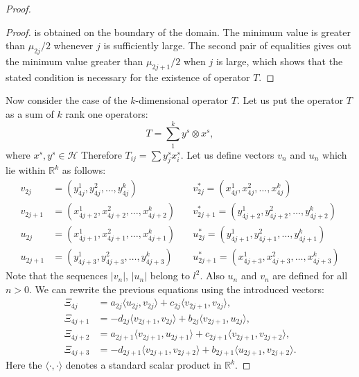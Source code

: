 \documentclass[12pt]{article}
\renewcommand{\cal}[1]{\mathcal{#1}}
\theoremstyle{definition}
\numberwithin{remark}{section}
\numberwithin{theorem}{section}
\numberwithin{prop}{section}
\numberwithin{equation}{section}
\numberwithin{lemma}{section}
\numberwithin{prop_under_lemma}{lemma}
\begin{document}
\begin{proof}
\begin{proof}
            is obtained on the boundary of the domain. The minimum value is greater than $\mu_{2j}/2$ whenever $j$ is
            sufficiently large.
            The second pair of equalities gives out the minimum value greater than $\mu_{2j+1}/2$ when $j$ is large,
            which shows that the stated condition is necessary for the existence of operator $T$.
        \end{proof}
        Now consider the case of the $k$-dimensional operator $T$.
        Let us put the operator $T$ as a sum of $k$ rank one operators:
        $$
            T = \sum_1^k y^s \otimes x^s,
        $$
        where $x^s, y^s \in \cal{H}$
        Therefore $T_{ij} = \sum {y^s_j x^s_i}$.
        Let us define vectors $v_n$ and $u_n$ which lie within $\mathbb{R}^k$ as follows:
        \begin{align*}
            v_{2j} &= (y^1_{4j}, y^2_{4j}, \dots ,y^k_{4j}) \quad
            &v^*_{2j} = (x^1_{4j}, x^2_{4j}, \dots ,x^k_{4j}) \\
            v_{2j+1} &= (x^1_{4j+2}, x^2_{4j+2}, \dots ,x^k_{4j+2}) \quad
            &v^*_{2j+1} = (y^1_{4j+2}, y^2_{4j+2}, \dots ,y^k_{4j+2}) \\
            u_{2j} &= (x^1_{4j+1}, x^2_{4j+1}, \dots ,x^k_{4j+1}) \quad
            &u^*_{2j} = (y^1_{4j+1}, y^2_{4j+1}, \dots ,y^k_{4j+1}) \\
            u_{2j+1} &= (y^1_{4j+3}, y^2_{4j+3}, \dots ,y^k_{4j+3}) \quad
            &u^*_{2j+1} = (x^1_{4j+3}, x^2_{4j+3}, \dots ,x^k_{4j+3}) 
        \end{align*}
        Note that the sequences $|v_n|$, $|u_n|$ belong to $l^2$. Also $u_n$ and $v_n$ are defined for all $n > 0$.
        We can rewrite the previous equations using the introduced vectors:
        \begin{align*}
            \Xi_{4j} &= a_{2j} \langle u_{2j}, v_{2j}\rangle + c_{2j} \langle v_{2j+1}, v_{2j}\rangle,\\
            \Xi_{4j + 1} &= -d_{2j} \langle v_{2j+1}, v_{2j}\rangle + b_{2j} \langle v_{2j+1}, u_{2j}\rangle,\\
            \Xi_{4j + 2} &= a_{2j+1} \langle v_{2j+1}, u_{2j+1} \rangle + c_{2j+1} \langle v_{2j+1}, v_{2j+2} \rangle,\\
            \Xi_{4j + 3} &= -d_{2j+1} \langle v_{2j+1}, v_{2j+2}\rangle + b_{2j+1} \langle u_{2j+1}, v_{2j+2} \rangle.
        \end{align*}
        Here the $\langle\cdot, \cdot\rangle$ denotes a standard scalar product in $\mathbb{R}^k$.

\end{proof}
\end{document}
